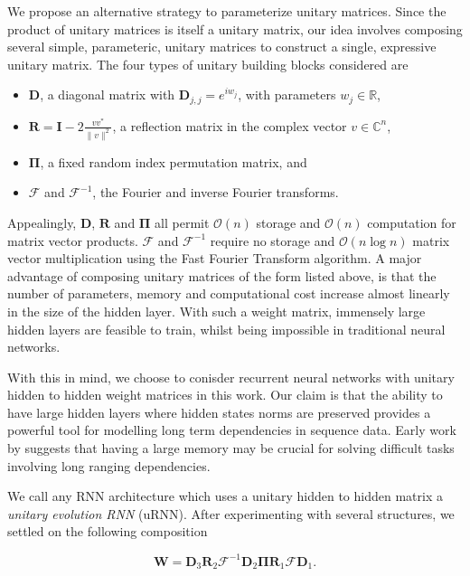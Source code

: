 \documentclass{article} %
\newcommand{\matr}[1]{\mathbf{#1}}
\newcommand\RR{\mathbb{R}}
\begin{document}
We propose an alternative strategy to parameterize unitary matrices. 
Since the product of unitary matrices is itself a unitary matrix, our idea involves
composing several simple, parameteric, unitary matrices to construct a single, expressive unitary matrix.
The four types of unitary building blocks considered are 

\begin{itemize}
  \item $\matr{D}$, a diagonal matrix with $\matr{D}_{j,j} = e^{i w_j}$, with parameters $w_j \in \RR$,
  \item $\matr{R} = \matr{I} - 2 \frac{v v^*}{\|v\|^2}$, a reflection matrix in the complex vector 
  $v \in \mathbb{C}^n$, 
  \item $\matr{\Pi}$, a fixed random index permutation matrix, and
  \item $\mathcal{F}$ and $\mathcal{F}^{-1}$, the Fourier and inverse Fourier transforms.
\end{itemize}

Appealingly, $\matr{D}$, $\matr{R}$ and $\matr{\Pi}$ all permit $\mathcal{O}(n)$ storage and 
$\mathcal{O}(n)$ computation for matrix vector products. $\mathcal{F}$ and $\mathcal{F}^{-1}$
require no storage and $\mathcal{O}(n \log n)$ matrix vector multiplication using the Fast Fourier
Transform algorithm. A major advantage of composing unitary matrices of the form listed above, is 
that the number of parameters, memory and computational cost increase almost linearly in the size
of the hidden layer. With such a weight matrix, immensely large hidden layers are feasible to train, 
whilst being impossible in traditional neural networks. 
 
With this in mind, we choose to conisder recurrent neural networks with unitary hidden to hidden
weight matrices in this work. Our claim is that the ability to have large hidden layers where hidden 
states norms are preserved provides a powerful tool for modelling long term dependencies in sequence data. 
Early work by \cite{Yoshua94} suggests that having a large memory may be crucial for solving 
difficult tasks involving long ranging dependencies.

We call any RNN architecture which uses a unitary hidden to hidden matrix a \textit{unitary evolution RNN}
(uRNN). After experimenting with several structures, we settled on the following composition

\begin{equation} \matr{W} = \matr{D}_3 \matr{R}_2 \mathcal{F}^{-1} \matr{D}_2 \matr{\Pi} \matr{R}_1 \mathcal{F} \matr{D}_1 .\end{equation}
\end{document}
